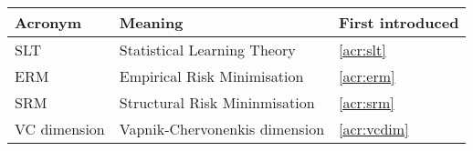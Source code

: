 \begin{tabular}{l l l}

\bf{Acronym} & \bf{Meaning} & \bf{First introduced} \\ \hline \hline

SLT	& Statistical Learning Theory 	& \ref{acr:slt} \\
ERM	& Empirical Risk Minimisation 	& \ref{acr:erm} \\
SRM	& Structural Risk Mininmisation & \ref{acr:srm} \\
VC dimension & Vapnik-Chervonenkis dimension & \ref{acr:vcdim} \\
\hline

\end{tabular}

